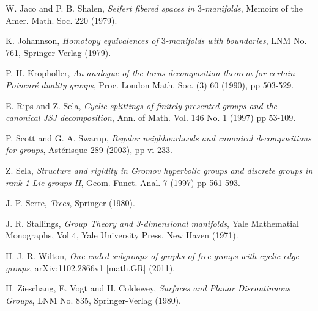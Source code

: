 \documentclass[12pt]{amsart}
\begin{document}
\begin{thebibliography}{9}
 W. Jaco and P. B. Shalen, {\em Seifert fibered spaces in $3$-manifolds}, Memoirs of the Amer. Math. Soc. 220 (1979).

 K. Johannson, {\em Homotopy equivalences of $3$-manifolds with boundaries}, LNM No. 761, Springer-Verlag (1979).

 P. H. Kropholler, {\em An analogue of the torus decomposition theorem for certain Poincar\'e duality groups}, Proc. London Math. Soc. (3) 60 (1990), pp 503-529.

 E. Rips and Z. Sela, {\em Cyclic splittings of finitely presented groups and the canonical JSJ decomposition}, Ann. of Math. Vol. 146 No. 1 (1997) pp 53-109.

 P. Scott and G. A. Swarup, {\em Regular neighbourhoods and canonical decompositions for groups}, Ast\'erisque 289 (2003), pp vi-233.

 Z. Sela, {\em Structure and rigidity in Gromov hyperbolic groups and discrete groups in rank 1 Lie groups II}, Geom. Funct. Anal. 7 (1997) pp 561-593.

 J. P. Serre, {\em Trees}, Springer (1980).


 J. R. Stallings, {\em Group Theory and 3-dimensional manifolds}, Yale Mathematial Monographs, Vol 4, Yale University Press, New Haven (1971).


 H. J. R. Wilton, {\em One-ended subgroups of graphs of free groups with cyclic edge groups}, arXiv:1102.2866v1 [math.GR] (2011).
 
 H. Zieschang, E. Vogt and H. Coldewey, {\em Surfaces and Planar Discontinuous Groups}, LNM No. 835, Springer-Verlag (1980).


\end{thebibliography}
\end{document}
